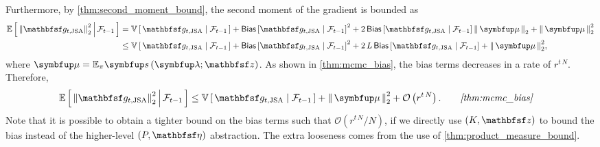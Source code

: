 \begin{proofEnd}
  Furthermore, by \cref{thm:second_moment_bound}, the second moment of the gradient is bounded as
  \begin{alignat}{2}
    \E{ {\lVert \rvvg_{t,\text{JSA}} \rVert}_2^2 \,\middle|\, \mathcal{F}_{t-1} } 
    &=
    \V{\rvvg_{t,\text{JSA}} \mid \mathcal{F}_{t-1}} + {\mathsf{Bias}\left[\rvvg_{t,\text{JSA}} \mid \mathcal{F}_{t-1}\right]}^2 + 2\, \mathsf{Bias}\left[\rvvg_{t,\text{JSA}} \mid \mathcal{F}_{t-1}\right] \norm{\vmu}_2 + \norm{\vmu}^2_2
    \nonumber
    \\
    &\leq
    \V{ \rvvg_{t,\text{JSA}} \mid \mathcal{F}_{t-1}} + {\mathsf{Bias}\left[\rvvg_{t,\text{JSA}} \mid \mathcal{F}_{t-1}\right]}^2 + 2\,L\,\mathsf{Bias}\left[\rvvg_{t,\text{JSA}} \mid \mathcal{F}_{t-1}\right] + \norm{\vmu}^2_2,
    \nonumber
  \end{alignat}
  where \(\vmu = \mathbb{E}_{\pi}\vs\left(\vlambda; \rvvz\right)\).
  As shown in \cref{thm:mcmc_bias}, the bias terms decreases in a rate of \(r^{t\,N}\).
  Therefore, 
  \begin{alignat}{2}
    \E{ {\lVert \rvvg_{t,\text{JSA}} \rVert}_2^2 \,\middle|\, \mathcal{F}_{t-1} } 
    &\leq
    \V{ \rvvg_{t,\text{JSA}} \mid \mathcal{F}_{t-1}} + \norm{\vmu}^2_2 + \mathcal{O}\left(r^{t\,N}\right).
    &&\quad\text{\textit{\cref{thm:mcmc_bias}}}
    \nonumber
  \end{alignat}
  Note that it is possible to obtain a tighter bound on the bias terms such that \(\mathcal{O}\left(r^{t\,N}/N\right)\), if we directly use \(\left(K, \rvvz\right)\) to bound the bias instead of the higher-level \(\left(P, \rvveta\right)\) abstraction.
  The extra looseness comes from the use of \cref{thm:product_measure_bound}.


\end{proofEnd}
